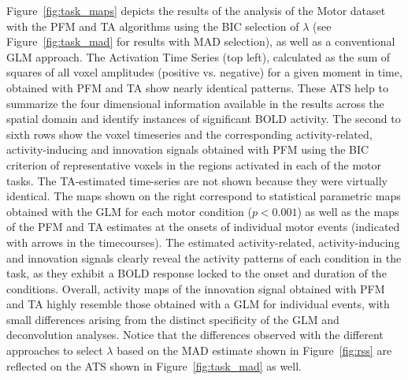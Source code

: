 Figure~\ref{fig:task_maps} depicts the results of the analysis of the Motor
dataset with the PFM and TA algorithms using the BIC selection of $\lambda$ (see
Figure~\ref{fig:task_mad} for results with MAD selection), as well as a
conventional GLM approach. The Activation Time Series (top left), calculated as
the sum of squares of all voxel amplitudes (positive vs. negative) for a given
moment in time, obtained with PFM and TA show nearly identical patterns. These
ATS help to summarize the four dimensional information available in the results
across the spatial domain and identify instances of significant BOLD activity.
The second to sixth rows show the voxel timeseries and the corresponding
activity-related, activity-inducing and innovation signals obtained with PFM
using the BIC criterion of representative voxels in the regions activated in
each of the motor tasks. The TA-estimated time-series are not shown because they
were virtually identical. The maps shown on the right correspond to statistical
parametric maps obtained with the GLM for each motor condition ($p < 0.001$) as
well as the maps of the PFM and TA estimates at the onsets of individual motor
events (indicated with arrows in the timecourses). The estimated
activity-related, activity-inducing and innovation signals clearly reveal the
activity patterns of each condition in the task, as they exhibit a BOLD response
locked to the onset and duration of the conditions. Overall, activity maps of
the innovation signal obtained with PFM and TA highly resemble those obtained
with a GLM for individual events, with small differences
arising from the distinct specificity of the GLM and deconvolution analyses.
Notice that the differences observed with the different approaches to select
$\lambda$ based on the MAD estimate shown in Figure~\ref{fig:rss} are reflected
on the ATS shown in Figure~\ref{fig:task_mad} as well.

